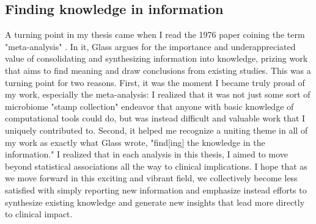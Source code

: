 \subsection{Finding knowledge in information}

A turning point in my thesis came when I read the 1976 paper coining the term "meta-analysis" \cite{glass-1976}.
In it, Glass argues for the importance and underappreciated value of consolidating and synthesizing information into knowledge, prizing work that aims to find meaning and draw conclusions from existing studies.
This was a turning point for two reasons.
First, it was the moment I became truly proud of my work, especially the meta-analysis: I realized that it was not just some sort of microbiome "stamp collection" endeavor that anyone with basic knowledge of computational tools could do, but was instead difficult and valuable work that I uniquely contributed to.
Second, it helped me recognize a uniting theme in all of my work as exactly what Glass wrote, "find[ing] the knowledge in the information."
I realized that in each analysis in this thesis, I aimed to move beyond statistical associations all the way to clinical implications.
I hope that as we move forward in this exciting and vibrant field, we collectively become less satisfied with simply reporting new information and emphasize instead efforts to synthesize existing knowledge and generate new insights that lead more directly to clinical impact.

\begin{singlespace}


\end{singlespace}
